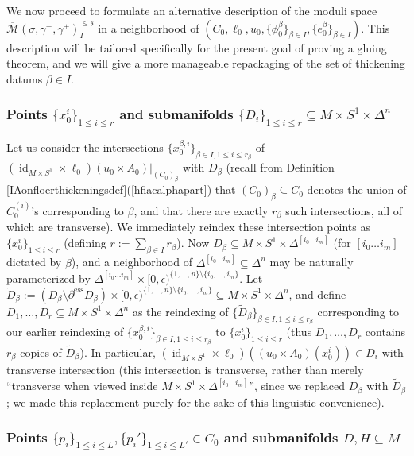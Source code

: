 \documentclass[12pt]{article}
\theoremstyle{definition}
\theoremstyle{remark}
\numberwithin{equation}{subsection}
\newcommand{\s}{\mathfrak s}
\newcommand{\Mbar}{\overline{\mathcal M}}
\newcommand{\ess}{\mathrm{ess}}
\newcommand{\id}{\operatorname{id}}
\begin{document}
We now proceed to formulate an alternative description of the moduli space $\Mbar(\sigma,\gamma^-,\gamma^+)^{\leq\s}_I$ in a neighborhood of $(C_0,\ell_0,u_0,\{\phi^\beta_0\}_{\beta\in I},\{e^\beta_0\}_{\beta\in I})$.  This description will be tailored specifically for the present goal of proving a gluing theorem, and we will give a more manageable repackaging of the set of thickening datums $\beta\in I$.

\subsubsection{Points $\{x^i_0\}_{1\leq i\leq r}$ and submanifolds $\{D_i\}_{1\leq i\leq r}\subseteq M\times S^1\times\Delta^n$}\label{reindexingsec}

Let us consider the intersections $\{x_0^{\beta,i}\}_{\beta\in I,1\leq i\leq r_\beta}$ of $(\id_{M\times S^1}\times\ell_0)(u_0\times A_0)|_{(C_0)_\beta}$ with $D_\beta$ (recall from Definition \ref{IAonfloerthickeningsdef}(\ref{hfiacalphapart}) that $(C_0)_\beta\subseteq C_0$ denotes the union of $C_0^{(i)}$'s corresponding to $\beta$, and that there are exactly $r_\beta$ such intersections, all of which are transverse).  We immediately reindex these intersection points as $\{x_0^i\}_{1\leq i\leq r}$ (defining $r:=\sum_{\beta\in I}r_\beta$).  Now $D_\beta\subseteq M\times S^1\times\Delta^{[i_0\ldots i_m]}$ (for $[i_0\ldots i_m]$ dictated by $\beta$), and a neighborhood of $\Delta^{[i_0\ldots i_m]}\subseteq\Delta^n$ may be naturally parameterized by $\Delta^{[i_0\ldots i_m]}\times[0,\epsilon)^{\{1,\ldots,n\}\setminus\{i_0,\ldots,i_m\}}$.  Let $\tilde D_\beta:=(D_\beta\setminus\partial^\ess D_\beta)\times[0,\epsilon)^{\{1,\ldots,n\}\setminus\{i_0,\ldots,i_m\}}\subseteq M\times S^1\times\Delta^n$, and define $D_1,\ldots,D_r\subseteq M\times S^1\times\Delta^n$ as the reindexing of $\{\tilde D_\beta\}_{\beta\in I,1\leq i\leq r_\beta}$ corresponding to our earlier reindexing of $\{x_0^{\beta,i}\}_{\beta\in I,1\leq i\leq r_\beta}$ to $\{x_0^i\}_{1\leq i\leq r}$ (thus $D_1,\ldots,D_r$ contains $r_\beta$ copies of $\tilde D_\beta$).  In particular, $(\id_{M\times S^1}\times\ell_0)((u_0\times A_0)(x_0^i))\in D_i$ with transverse intersection (this intersection is transverse, rather than merely ``transverse when viewed inside $M\times S^1\times\Delta^{[i_0\ldots i_m]}$'', since we replaced $D_\beta$ with $\tilde D_\beta$; we made this replacement purely for the sake of this linguistic convenience).

\subsubsection{Points $\{p_i\}_{1\leq i\leq L},\{p_i'\}_{1\leq i\leq L'}\in C_0$ and submanifolds $D,H\subseteq M$}\label{choosingDH}
\end{document}

